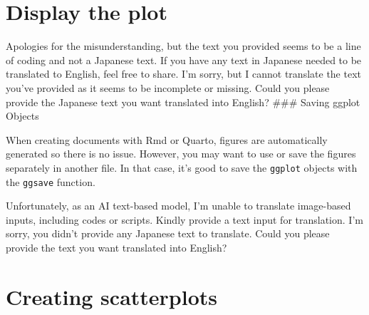 \documentclass[
  a4paper,
]{book}
\begin{document}

\chapter{Display the plot}\label{display-the-plot}

Apologies for the misunderstanding, but the text you provided seems to
be a line of coding and not a Japanese text. If you have any text in
Japanese needed to be translated to English, feel free to share. I'm
sorry, but I cannot translate the text you've provided as it seems to be
incomplete or missing. Could you please provide the Japanese text you
want translated into English? \#\#\# Saving ggplot Objects

When creating documents with Rmd or Quarto, figures are automatically
generated so there is no issue. However, you may want to use or save the
figures separately in another file. In that case, it's good to save the
\texttt{ggplot} objects with the \texttt{ggsave} function.

Unfortunately, as an AI text-based model, I'm unable to translate
image-based inputs, including codes or scripts. Kindly provide a text
input for translation. I'm sorry, you didn't provide any Japanese text
to translate. Could you please provide the text you want translated into
English?


\chapter{Creating scatterplots}\label{creating-scatterplots}
\end{document}
